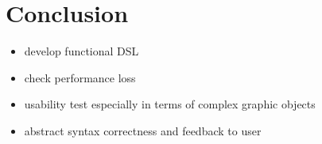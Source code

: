 \chapter{Conclusion}
\label{chap:conclusion}



\begin{itemize}
  \item develop functional DSL
  \item check performance loss
  \item usability test especially in terms of complex graphic objects
  \item abstract syntax correctness and feedback to user
\end{itemize}

